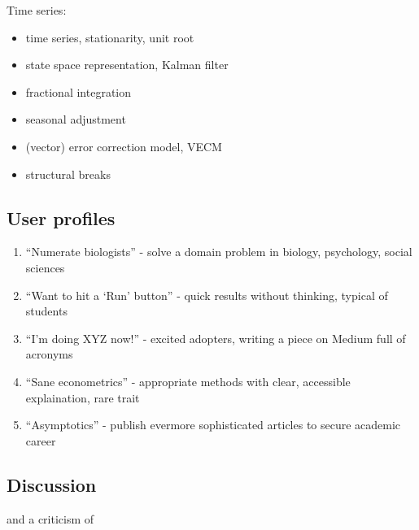 \documentclass[letterpaper,10pt,english]{sphinxmanual}
\begin{document}
Time series:
\begin{itemize}
\item {} 
time series, stationarity, unit root

\item {} 
state space representation, Kalman filter

\item {} 
fractional integration

\item {} 
seasonal adjustment

\item {} 
(vector) error correction model, VECM

\item {} 
structural breaks

\end{itemize}


\subsection{User profiles}
\label{\detokenize{textbook/mindmap:user-profiles}}\begin{enumerate}
%
\item {} 
“Numerate biologists” - solve a domain problem in biology, psychology, social sciences

\item {} 
“Want to hit a ‘Run’ button” - quick results without thinking, typical of students

\item {} 
“I’m doing XYZ now!” - excited adopters, writing a piece on Medium full of acronyms

\item {} 
“Sane econometrics” - appropriate methods with clear, accessible explaination, rare trait

\item {} 
“Asymptotics” - publish evermore sophisticated articles to secure academic career

\end{enumerate}


\subsection{Discussion}
\label{\detokenize{textbook/mindmap:discussion}}
 and a criticism of 
\end{document}
